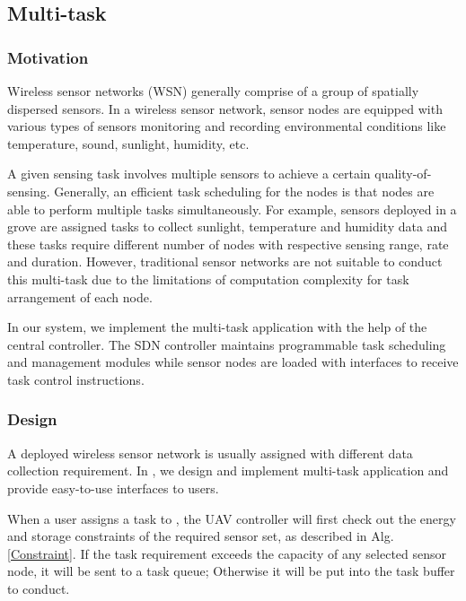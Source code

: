 \subsection{Multi-task}
\label{subsectionmultitask}
\subsubsection{Motivation}

Wireless sensor networks (WSN)  generally comprise of a group of 
spatially dispersed sensors. In a wireless sensor network, 
sensor nodes are equipped with various 
types of sensors monitoring and recording 
environmental conditions like temperature, sound, sunlight,
humidity, etc.

A given sensing task involves multiple sensors to 
achieve a certain quality-of-sensing.
Generally, an efficient task scheduling for the nodes is that nodes 
are able to perform multiple tasks simultaneously. 
For example, sensors deployed in a grove are assigned tasks to collect
sunlight, temperature and humidity data and these tasks require different 
number of  nodes with respective sensing range, rate and duration.
However, traditional sensor networks are not suitable to conduct this 
multi-task due to the limitations of computation complexity for task 
arrangement of each node.

In our {\sdn} system, we implement the multi-task application 
with the help of the central controller. The SDN controller
maintains programmable task scheduling and management
modules while sensor nodes are loaded with interfaces to
receive task control instructions.     

\subsubsection{Design}

A deployed wireless sensor network is usually assigned  with
different data collection requirement. In {\sdn}, we design and 
implement multi-task application and provide easy-to-use
interfaces to users.

When a user assigns a task to {\sdn}, the UAV controller will first check out 
the energy and storage constraints of the required sensor set, as described in Alg. \ref{Constraint}. 
If the task requirement exceeds the capacity of any selected sensor node, it will be sent to a     
task queue; Otherwise it will be put into the task buffer to conduct.


